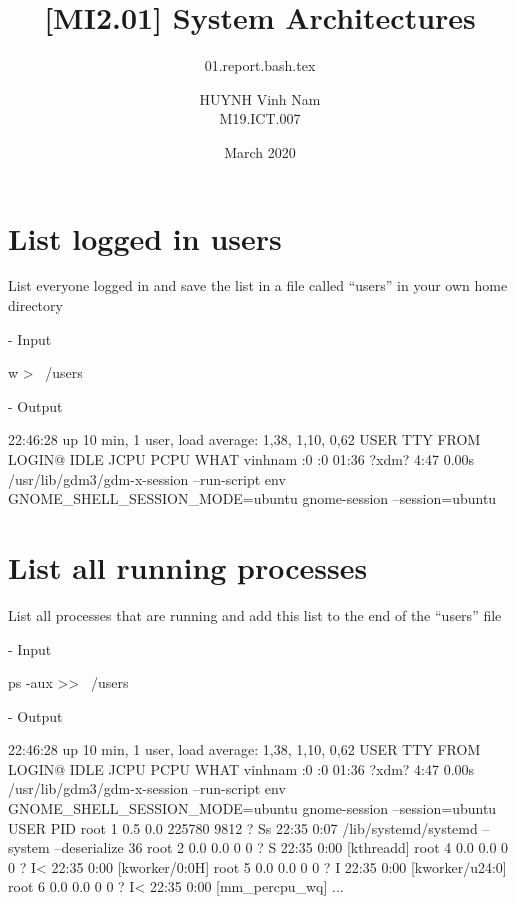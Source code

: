 \documentclass[10pt, a4paper]{article}
\title{[MI2.01] System Architectures}
\subtitle{01.report.bash.tex}
\author{HUYNH Vinh Nam \\ M19.ICT.007}
\date{March 2020}
\begin{document}
\maketitle

\section{List logged in users}

List everyone logged in and save the list in a file called “users” in your own home directory

\noindent - Input

\begin{verbbox}
w > ~/users
\end{verbbox}

\fbox{
\theverbbox
}

\noindent - Output

\begin{verbbox}
 22:46:28 up 10 min,  1 user,  load average: 1,38, 1,10, 0,62
USER     TTY      FROM             LOGIN@   IDLE   JCPU   PCPU WHAT
vinhnam  :0       :0               01:36   ?xdm?   4:47   0.00s /usr/lib/gdm3/gdm-x-session 
--run-script env GNOME_SHELL_SESSION_MODE=ubuntu gnome-session --session=ubuntu
\end{verbbox}

\fbox{
\theverbbox
}

\section{List all running processes}

List all processes that are running and add this list to the end of the “users” file

\noindent - Input

\begin{verbbox}
ps -aux >> ~/users
\end{verbbox}

\fbox{
\theverbbox
}

\pagebreak

\noindent - Output

\begin{verbbox}
 22:46:28 up 10 min,  1 user,  load average: 1,38, 1,10, 0,62
USER     TTY      FROM             LOGIN@   IDLE   JCPU   PCPU WHAT
vinhnam  :0       :0               01:36   ?xdm?   4:47   0.00s /usr/lib/gdm3/gdm-x-session 
--run-script env GNOME_SHELL_SESSION_MODE=ubuntu gnome-session --session=ubuntu
USER       PID %
root         1  0.5  0.0 225780  9812 ?        Ss   22:35   0:07 /lib/systemd/systemd 
--system --deserialize 36
root         2  0.0  0.0      0     0 ?        S    22:35   0:00 [kthreadd]
root         4  0.0  0.0      0     0 ?        I<   22:35   0:00 [kworker/0:0H]
root         5  0.0  0.0      0     0 ?        I    22:35   0:00 [kworker/u24:0]
root         6  0.0  0.0      0     0 ?        I<   22:35   0:00 [mm_percpu_wq]
...
\end{verbbox}
\end{document}
